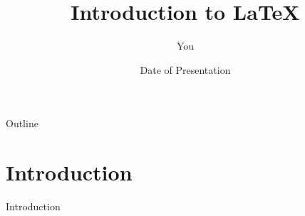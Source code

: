 \documentclass{beamer}
\title{Introduction to LaTeX}
\author{You}
\institute{Where You're From}
\date{Date of Presentation}
\begin{document}
\begin{frame}
  \titlepage
\end{frame}

\begin{frame}{Outline}
  \tableofcontents
\end{frame}

\section{Introduction}

\begin{frame}{Introduction}

\end{frame}
\end{document}
